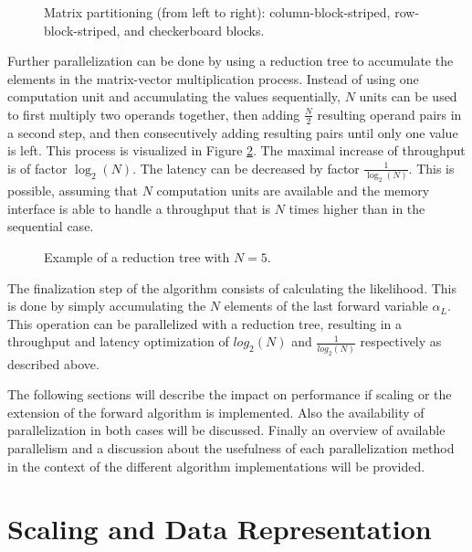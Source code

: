 \documentclass[mscthesis]{usiinfthesis}
\begin{document}
\begin{figure}
    \centering
    
    \caption{Matrix partitioning (from left to right): column-block-striped,
        row-block-striped, and checkerboard blocks.}
    \label{fig:matrix_partitioning}
\end{figure}

Further parallelization can be done by using a reduction tree to accumulate the
elements in the matrix-vector multiplication process. Instead of using one
computation unit and accumulating the values sequentially, $N$ units can be used
to first multiply two operands together, then adding $\frac{N}{2}$ resulting
operand pairs in a second step, and then consecutively adding resulting pairs
until only one value is left. This process is visualized in Figure
\ref{fig:red_tree}. The maximal increase of throughput is of factor
$\log_2(N)$.  The latency can be decreased by factor $\frac{1}{\log_2(N)}$.
This is possible, assuming that $N$ computation units are available and the
memory interface is able to handle a throughput that is $N$ times higher than
in the sequential case.

\begin{figure}
    \centering
    
    \caption{Example of a reduction tree with $N=5$.}
    \label{fig:red_tree}
\end{figure}

The finalization step of the algorithm consists of calculating the likelihood.
This is done by simply accumulating the $N$ elements of the last forward
variable $\alpha_L$. This operation can be parallelized with a reduction tree,
resulting in a throughput and latency optimization of $log_2(N)$ and
$\frac{1}{log_2(N)}$ respectively as described above.

The following sections will describe the impact on performance if scaling or
the extension of the forward algorithm is implemented. Also the availability of
parallelization in both cases will be discussed. Finally an overview of
available parallelism and a discussion about the usefulness of each
parallelization method in the context of the different algorithm
implementations will be provided.

\section{Scaling and Data Representation}
\label{ch:analysis_scaling}
\end{document}

